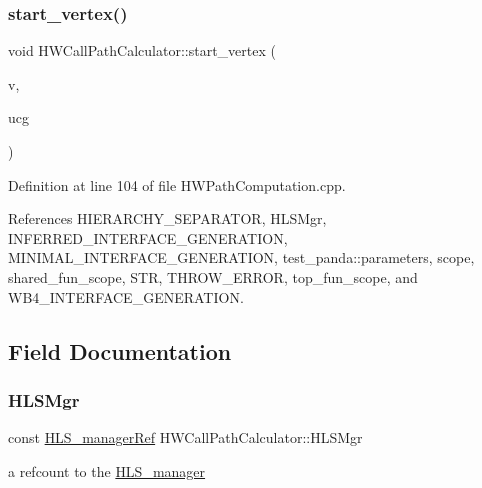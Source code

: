 \subsubsection{\texorpdfstring{start\+\_\+vertex()}{start\_vertex()}}
{\footnotesize\ttfamily void H\+W\+Call\+Path\+Calculator\+::start\+\_\+vertex (\begin{DoxyParamCaption}\item[{const \hyperlink{UnfoldedCallGraph_8hpp_a6c87395c9d950d587c8e4db39b93e3e2}{Unfolded\+Vertex\+Descriptor} \&}]{v,  }\item[{const \hyperlink{classUnfoldedCallGraph}{Unfolded\+Call\+Graph} \&}]{ucg }\end{DoxyParamCaption})}



Definition at line 104 of file H\+W\+Path\+Computation.\+cpp.



References H\+I\+E\+R\+A\+R\+C\+H\+Y\+\_\+\+S\+E\+P\+A\+R\+A\+T\+OR, H\+L\+S\+Mgr, I\+N\+F\+E\+R\+R\+E\+D\+\_\+\+I\+N\+T\+E\+R\+F\+A\+C\+E\+\_\+\+G\+E\+N\+E\+R\+A\+T\+I\+ON, M\+I\+N\+I\+M\+A\+L\+\_\+\+I\+N\+T\+E\+R\+F\+A\+C\+E\+\_\+\+G\+E\+N\+E\+R\+A\+T\+I\+ON, test\+\_\+panda\+::parameters, scope, shared\+\_\+fun\+\_\+scope, S\+TR, T\+H\+R\+O\+W\+\_\+\+E\+R\+R\+OR, top\+\_\+fun\+\_\+scope, and W\+B4\+\_\+\+I\+N\+T\+E\+R\+F\+A\+C\+E\+\_\+\+G\+E\+N\+E\+R\+A\+T\+I\+ON.



\subsection{Field Documentation}
\mbox{\label{classHWCallPathCalculator_a232983d5550599d833b9dc14333a1b1f}} 
\subsubsection{\texorpdfstring{H\+L\+S\+Mgr}{HLSMgr}}
{\footnotesize\ttfamily const \hyperlink{hls__manager_8hpp_acd3842b8589fe52c08fc0b2fcc813bfe}{H\+L\+S\+\_\+manager\+Ref} H\+W\+Call\+Path\+Calculator\+::\+H\+L\+S\+Mgr\hspace{0.3cm}{\ttfamily [protected]}}



a refcount to the \hyperlink{classHLS__manager}{H\+L\+S\+\_\+manager} 




